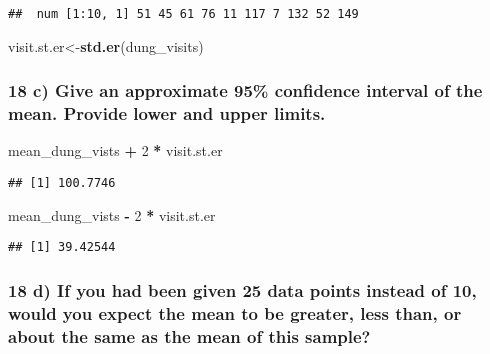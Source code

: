 \documentclass[]{article}
\newenvironment{Shaded}{\begin{snugshade}}{\end{snugshade}}
\newcommand{\KeywordTok}[1]{\textcolor[rgb]{0.13,0.29,0.53}{\textbf{#1}}}
\newcommand{\DecValTok}[1]{\textcolor[rgb]{0.00,0.00,0.81}{#1}}
\newcommand{\StringTok}[1]{\textcolor[rgb]{0.31,0.60,0.02}{#1}}
\newcommand{\OperatorTok}[1]{\textcolor[rgb]{0.81,0.36,0.00}{\textbf{#1}}}
\newcommand{\NormalTok}[1]{#1}
\begin{document}
\begin{verbatim}
##  num [1:10, 1] 51 45 61 76 11 117 7 132 52 149
\end{verbatim}

\begin{Shaded}
\begin{Highlighting}[]
\NormalTok{visit.st.er<-}\KeywordTok{std.er}\NormalTok{(dung_visits)}
\end{Highlighting}
\end{Shaded}

\subsubsection{18 c) Give an approximate 95\% confidence interval of the
mean. Provide lower and upper
limits.}\label{c-give-an-approximate-95-confidence-interval-of-the-mean.-provide-lower-and-upper-limits.}

\begin{Shaded}
\begin{Highlighting}[]
\NormalTok{mean_dung_vists }\OperatorTok{+}\StringTok{ }\DecValTok{2} \OperatorTok{*}\StringTok{ }\NormalTok{visit.st.er}
\end{Highlighting}
\end{Shaded}

\begin{verbatim}
## [1] 100.7746
\end{verbatim}

\begin{Shaded}
\begin{Highlighting}[]
\NormalTok{mean_dung_vists }\OperatorTok{-}\StringTok{ }\DecValTok{2} \OperatorTok{*}\StringTok{ }\NormalTok{visit.st.er}
\end{Highlighting}
\end{Shaded}

\begin{verbatim}
## [1] 39.42544
\end{verbatim}

\subsubsection{18 d) If you had been given 25 data points instead of 10,
would you expect the mean to be greater, less than, or about the same as
the mean of this
sample?}\label{d-if-you-had-been-given-25-data-points-instead-of-10-would-you-expect-the-mean-to-be-greater-less-than-or-about-the-same-as-the-mean-of-this-sample}
\end{document}
